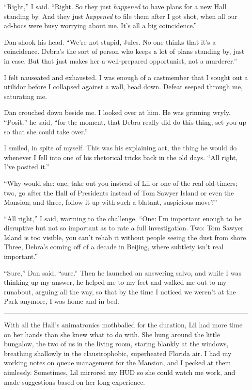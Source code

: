 “Right,” I said. “Right. So they just \emph{happened} to have plans
for a new Hall standing by. And they just \emph{happened} to file
them after I got shot, when all our ad-hocs were busy worrying
about me. It's all a big coincidence.”

Dan shook his head. “We're not stupid, Jules. No one thinks that
it's a coincidence. Debra's the sort of person who keeps a lot of
plans standing by, just in case. But that just makes her a
well-prepared opportunist, not a murderer.”

I felt nauseated and exhausted. I was enough of a castmember that I
sought out a utilidor before I collapsed against a wall, head down.
Defeat seeped through me, saturating me.

Dan crouched down beside me. I looked over at him. He was grinning
wryly. “Posit,” he said, “for the moment, that Debra really did do
this thing, set you up so that she could take over.”

I smiled, in spite of myself. This was his explaining act, the
thing he would do whenever I fell into one of his rhetorical tricks
back in the old days. “All right, I've posited it.”

“Why would she: one, take out you instead of Lil or one of the real
old-timers; two, go after the Hall of Presidents instead of Tom
Sawyer Island or even the Mansion; and three, follow it up with
such a blatant, suspicious move?”

“All right,” I said, warming to the challenge. “One: I'm important
enough to be disruptive but not so important as to rate a full
investigation. Two: Tom Sawyer Island is too visible, you can't
rehab it without people seeing the dust from shore. Three, Debra's
coming off of a decade in Beijing, where subtlety isn't real
important.”

“Sure,” Dan said, “sure.” Then he launched an answering salvo, and
while I was thinking up my answer, he helped me to my feet and
walked me out to my runabout, arguing all the way, so that by the
time I noticed we weren't at the Park anymore, I was home and in
bed.

\begin{center}\rule{3in}{0.4pt}\end{center}

With all the Hall's animatronics mothballed for the duration, Lil
had more time on her hands than she knew what to do with. She hung
around the little bungalow, the two of us in the living room,
staring blankly at the windows, breathing shallowly in the
claustrophobic, superheated Florida air. I had my working notes on
queue management for the Mansion, and I pecked at them aimlessly.
Sometimes, Lil mirrored my HUD so she could watch me work, and made
suggestions based on her long experience.

